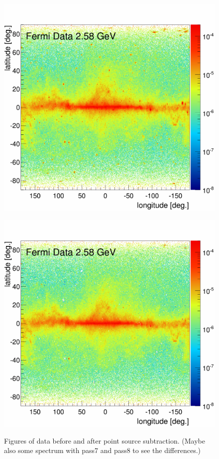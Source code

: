 \begin{figure}[h]
  \centering
  \begin{minipage}[h]{0.45\textwidth}
  	\centering
	\includegraphics[width=1.\linewidth]{pic/method/Flux_FermiData_raw_E12.png}
  	\label{fig:raw_data}
  \end{minipage}
  \hfill
  \begin{minipage}[h]{0.45\textwidth}
	  \centering
	  \includegraphics[width=1.\linewidth]{pic/method/Flux_FermiData-3FGL_E12.png}
	  \label{fig:data_ptsrc_subtracted}
  \end{minipage}
  \caption{Figures of data before and after point source subtraction. (Maybe also some spectrum with pass7 and pass8 to see the differences.)}
  \label{fig:method_pass8} 
\end{figure}


